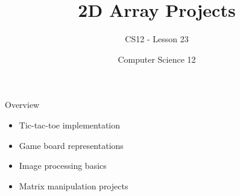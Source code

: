 \documentclass[10pt]{beamer}
\title{2D Array Projects}
\subtitle{CS12 - Lesson 23}
\author{Computer Science 12}
\date{}
\begin{document}
\begin{frame}
    \titlepage
\end{frame}

\begin{frame}{Overview}
    \begin{itemize}
        \item Tic-tac-toe implementation
        \item Game board representations
        \item Image processing basics
        \item Matrix manipulation projects
    \end{itemize}
\end{frame}

\end{document}
